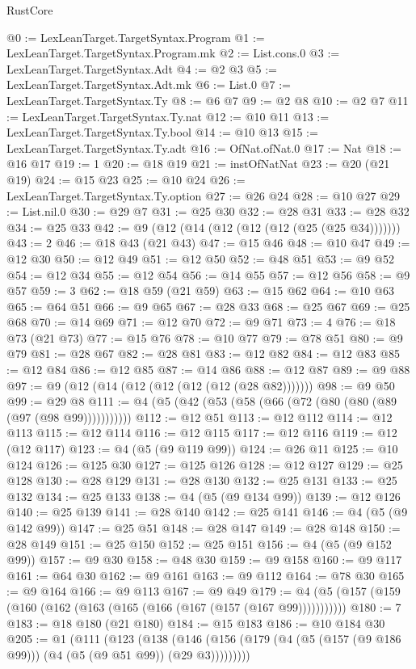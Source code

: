 \begin{lexlean}{RustCore}
\begin{coremodule}
@0 := LexLeanTarget.TargetSyntax.Program
@1 := LexLeanTarget.TargetSyntax.Program.mk
@2 := List.cons.{0}
@3 := LexLeanTarget.TargetSyntax.Adt
@4 := @2 @3
@5 := LexLeanTarget.TargetSyntax.Adt.mk
@6 := List.{0}
@7 := LexLeanTarget.TargetSyntax.Ty
@8 := @6 @7
@9 := @2 @8
@10 := @2 @7
@11 := LexLeanTarget.TargetSyntax.Ty.nat
@12 := @10 @11
@13 := LexLeanTarget.TargetSyntax.Ty.bool
@14 := @10 @13
@15 := LexLeanTarget.TargetSyntax.Ty.adt
@16 := OfNat.ofNat.{0}
@17 := Nat
@18 := @16 @17
@19 := 1
@20 := @18 @19
@21 := instOfNatNat
@23 := @20 (@21 @19)
@24 := @15 @23
@25 := @10 @24
@26 := LexLeanTarget.TargetSyntax.Ty.option
@27 := @26 @24
@28 := @10 @27
@29 := List.nil.{0}
@30 := @29 @7
@31 := @25 @30
@32 := @28 @31
@33 := @28 @32
@34 := @25 @33
@42 := @9 (@12 (@14 (@12 (@12 (@12 (@25 (@25 @34)))))))
@43 := 2
@46 := @18 @43 (@21 @43)
@47 := @15 @46
@48 := @10 @47
@49 := @12 @30
@50 := @12 @49
@51 := @12 @50
@52 := @48 @51
@53 := @9 @52
@54 := @12 @34
@55 := @12 @54
@56 := @14 @55
@57 := @12 @56
@58 := @9 @57
@59 := 3
@62 := @18 @59 (@21 @59)
@63 := @15 @62
@64 := @10 @63
@65 := @64 @51
@66 := @9 @65
@67 := @28 @33
@68 := @25 @67
@69 := @25 @68
@70 := @14 @69
@71 := @12 @70
@72 := @9 @71
@73 := 4
@76 := @18 @73 (@21 @73)
@77 := @15 @76
@78 := @10 @77
@79 := @78 @51
@80 := @9 @79
@81 := @28 @67
@82 := @28 @81
@83 := @12 @82
@84 := @12 @83
@85 := @12 @84
@86 := @12 @85
@87 := @14 @86
@88 := @12 @87
@89 := @9 @88
@97 := @9 (@12 (@14 (@12 (@12 (@12 (@12 (@28 @82)))))))
@98 := @9 @50
@99 := @29 @8
@111 := @4 (@5 (@42 (@53 (@58 (@66 (@72 (@80 (@80 (@89 (@97 (@98 @99)))))))))))
@112 := @12 @51
@113 := @12 @112
@114 := @12 @113
@115 := @12 @114
@116 := @12 @115
@117 := @12 @116
@119 := @12 (@12 @117)
@123 := @4 (@5 (@9 @119 @99))
@124 := @26 @11
@125 := @10 @124
@126 := @125 @30
@127 := @125 @126
@128 := @12 @127
@129 := @25 @128
@130 := @28 @129
@131 := @28 @130
@132 := @25 @131
@133 := @25 @132
@134 := @25 @133
@138 := @4 (@5 (@9 @134 @99))
@139 := @12 @126
@140 := @25 @139
@141 := @28 @140
@142 := @25 @141
@146 := @4 (@5 (@9 @142 @99))
@147 := @25 @51
@148 := @28 @147
@149 := @28 @148
@150 := @28 @149
@151 := @25 @150
@152 := @25 @151
@156 := @4 (@5 (@9 @152 @99))
@157 := @9 @30
@158 := @48 @30
@159 := @9 @158
@160 := @9 @117
@161 := @64 @30
@162 := @9 @161
@163 := @9 @112
@164 := @78 @30
@165 := @9 @164
@166 := @9 @113
@167 := @9 @49
@179 := @4 (@5 (@157 (@159 (@160 (@162 (@163 (@165 (@166 (@167 (@157 (@167 @99)))))))))))
@180 := 7
@183 := @18 @180 (@21 @180)
@184 := @15 @183
@186 := @10 @184 @30
@205 := @1
    (@111
      (@123
        (@138 (@146 (@156 (@179 (@4 (@5 (@157 (@9 @186 @99))) (@4 (@5 (@9 @51 @99)) (@29 @3)))))))))

\end{coremodule}
\end{lexlean}

